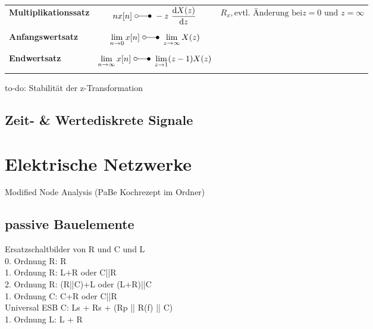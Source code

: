 \documentclass[a4paper]{article}
\begin{document}
\begin{table}[h!]
{\begin{tabular}{@{}>{\bfseries}lcc@{}}
Multiplikationssatz
	& $\displaystyle nx[n]\ \laplace\ -z\ \frac{\mathrm{d}X(z)}{\mathrm{d}z}$ 
	& {\scriptsize $R_x, \text{evtl. Änderung bei} z=0 \text{ und } z=\infty$} \\ \\
	
Anfangswertsatz
	& $\displaystyle \lim_{n \rightarrow 0} x[n]\ \laplace\ \lim_{z \rightarrow \infty} X(z)$ 
	&\\ \\
	
Endwertsatz
	& $\displaystyle \lim_{n \rightarrow \infty} x[n]\ \laplace\ \lim_{z \rightarrow 1} (z-1)X(z)$ 
	&\\ \\

\bottomrule
\end{tabular}
}
\end{table}

to-do: Stabilität der z-Transformation

\subsection{Zeit- \& Wertediskrete Signale}

\section{Elektrische Netzwerke}

Modified Node Analysis (PaBe Kochrezept im Ordner)

\subsection{passive Bauelemente}

Ersatzschaltbilder von R und C und L \\

0. Ordnung R: R \\

1. Ordnung R: L+R oder C||R \\

2. Ordnung R: (R||C)+L oder (L+R)||C \\

1. Ordnung C: C+R oder C||R \\

Universal ESB C: Ls + Rs + (Rp || R(f) || C) \\

1. Ordnung L: L + R \\
\end{document}

